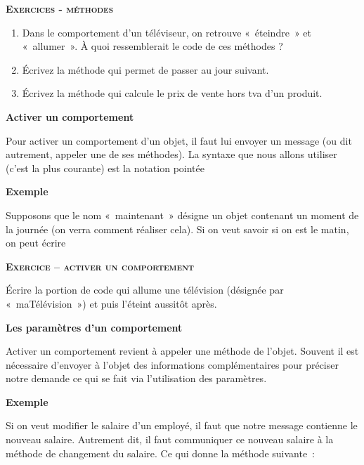 {\sffamily\bfseries\scshape
Exercices - méthodes}

\begin{enumerate}
	\item 
		Dans le comportement d'un téléviseur, on retrouve
		«~éteindre~» et «~allumer~». À quoi ressemblerait le code de ces
		méthodes ?
	\item 
		Écrivez la méthode qui permet de passer au jour suivant.
	\item 
		Écrivez la méthode qui calcule le prix de vente hors tva d'un produit.
\end{enumerate}

\bigskip

{\sffamily\bfseries
Activer un comportement}

{
Pour activer un comportement d'un objet, il faut lui
envoyer un message (ou dit autrement, appeler une de ses méthodes). La
syntaxe que nous allons utiliser (c'est la plus
courante) est la notation pointée}


{\bfseries
Exemple}

{
Supposons que le nom «~maintenant~» désigne un objet contenant un moment
de la journée (on verra comment réaliser cela). Si on veut savoir si on
est le matin, on peut écrire}



\bigskip

{\sffamily\bfseries\scshape
Exercice – activer un comportement}

Écrire la portion de code qui allume une télévision (désignée par
«~maTélévision~») et puis l'éteint aussitôt après.


\bigskip

{\sffamily\bfseries\upshape
Les paramètres d'un comportement}

{
Activer un comportement revient à appeler une méthode de
l'objet. Souvent il est nécessaire
d'envoyer à l'objet des informations
complémentaires pour préciser notre demande ce qui se fait via
l'utilisation des paramètres.}

{\bfseries
Exemple}

Si on veut modifier le salaire d'un employé, il faut
que notre message contienne le nouveau salaire. Autrement dit, il faut
communiquer ce nouveau salaire à la méthode de changement du salaire.
Ce qui donne la méthode suivante~:

